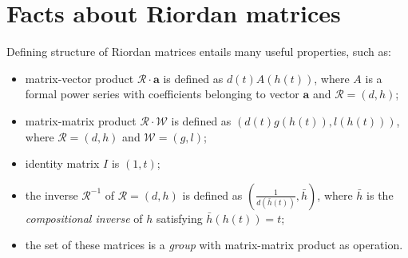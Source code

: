 \section*{Facts about Riordan matrices}

Defining structure of Riordan matrices entails many useful properties, such as:
\begin{itemize} 
\item matrix-vector product $\mathcal{R}\cdot \textbf{a}$ is defined as 
    $ d(t)A(h(t))$, where $A$ is a formal power series
    with coefficients belonging to vector $\textbf{a}$ and $\mathcal{R}=(d, h)$;
\item matrix-matrix product $\mathcal{R}\cdot \mathcal{W}$ is defined as 
    $(d(t)g(h(t)), l(h(t)))$, where $\mathcal{R}=(d, h)$ and $\mathcal{W}=(g, l)$;
\item identity matrix $I$ is $(1, t)$;
\item the inverse $\mathcal{R}^{-1}$ of $\mathcal{R}=(d, h)$ is defined as 
    $\left(\frac{1}{d(\bar{h}(t))}, \bar{h}\right)$, where $\bar{h}$ is the \emph{compositional inverse} 
    of $h$ satisfying $\bar{h}(h(t))=t$;
\item the set of these matrices is a \emph{group} with matrix-matrix product as operation.    
\end{itemize}

